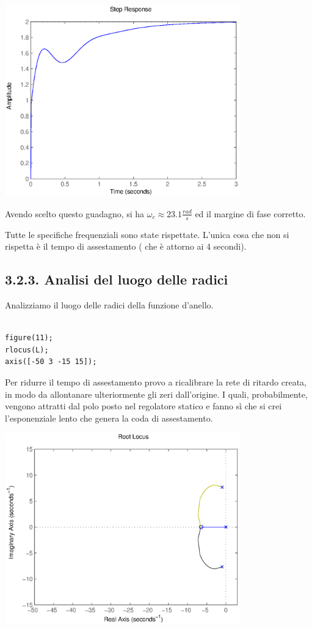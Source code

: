 \documentclass{article}
\begin{document}
\includegraphics [width=4in]{prog6RADICI_09.eps}

\begin{par}
Avendo scelto questo guadagno, si ha $ \omega_c \approx 23.1 \frac{rad}{s} $ ed il margine di fase corretto.

Tutte le specifiche frequenziali sono state rispettate.
L'unica cosa che non si rispetta è il tempo di assestamento ( che è attorno ai 4 secondi).
\end{par}

\subsection*{3.2.3. Analisi del luogo delle radici}

\begin{par}
Analizziamo il luogo delle radici della funzione d'anello.
\end{par}
\begin{verbatim}

figure(11);
rlocus(L);
axis([-50 3 -15 15]);
\end{verbatim}
\begin{par}
Per ridurre il tempo di assestamento provo a ricalibrare la rete di
ritardo creata, in modo da allontanare ulteriormente gli zeri dall'origine.
I quali, probabilmente, vengono attratti dal polo posto nel regolatore
statico e fanno sì che si crei l'esponenziale lento che genera la coda di
assestamento.
\end{par}

\includegraphics [width=4in]{prog6RADICI_10.eps}
\end{document}
